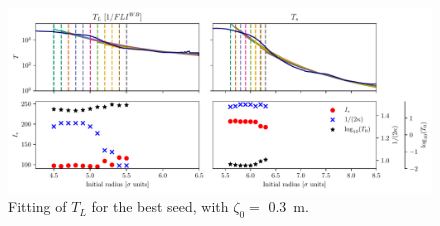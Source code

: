 \begin{figure}
    \centering
    \includegraphics[width=1\textwidth]{6_lhc_dynamic_indicators/figs/fit_l_time_best.pdf}
    \caption{Fitting of $T_L$ for the best seed, with $\zeta_0=$ \SI{0.3}{\meter}.}
\end{figure}

